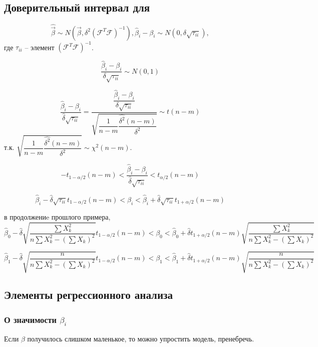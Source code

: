 \subsection{Доверительный интервал для \beta}

\[
  \hat{\vec{\beta}} \sim N\left(\vec{\beta}, \delta^2 (\mathcal{F}^T \mathcal{F})^{-1}\right),
  \hat{\beta}_i - \beta_i \sim N(0, \delta \sqrt{\tau_{ii}}),
\]
где $\tau_{ii}$ -- элемент $(\mathcal{F}^T \mathcal{F})^{-1}$.

\[
  \dfrac{\hat{\beta}_i - \beta_i}{\delta \sqrt{\tau_{ii}}} \sim N(0, 1)
\]

\[ 
  \dfrac{\hat{\beta}_i - \beta_i}{\hat{\delta} \sqrt{\tau_{ii}}}
  = \dfrac
  { \dfrac{\hat{\beta}_i - \beta_i}{\delta \sqrt{\tau_{ii}}} }
  { \sqrt{ \dfrac{1}{n-m} \dfrac{\hat{\delta^2} (n-m)}{\delta^2} } }
  \sim t(n-m)
\]
т.к. $ \sqrt{ \dfrac{1}{n-m} \dfrac{\hat{\delta^2} (n-m)}{\delta^2} } \sim \chi^2(n-m) $.

\[
  -t_{1-\alpha/2} (n-m) <
  \dfrac{\hat{\beta}_i - \beta_i}{\hat{\delta} \sqrt{\tau_{ii}}}
  < t_{\alpha/2} (n-m)
\]

\[
  \hat{\beta}_i - \hat{\delta} \sqrt{\tau_{ii}} t_{1-\alpha/2} (n-m) < 
  \beta_i <
  \hat{\beta}_i + \hat{\delta} \sqrt{\tau_{ii}} t_{1 + \alpha/2} (n-m)
\]

\begin{ex}
  в продолжениe прошлого примера,
  \[
    \hat{\beta}_0 - \hat{\delta} \sqrt{ \dfrac{\sum X_k^2}{n \sum{X_k^2} - \left( \sum X_k \right)^2 } } t_{1-\alpha/2} (n-m) < 
    \beta_0 <
    \hat{\beta}_0 + \hat{\delta} t_{1 + \alpha/2} (n-m) \sqrt{ \dfrac{\sum X_k^2}{n \sum{X_k^2} - \left( \sum X_k \right)^2 } }
  \]
  
  \[
    \hat{\beta}_1 - \hat{\delta} \sqrt{ \dfrac{n}{n \sum{X_k^2} - \left( \sum X_k \right)^2 } } t_{1-\alpha/2} (n-m) < 
    \beta_1 <
    \hat{\beta}_1 + \hat{\delta} t_{1 + \alpha/2} (n-m) \sqrt{ \dfrac{n}{n \sum{X_k^2} - \left( \sum X_k \right)^2 } }
  \]
\end{ex}

\subsection{Элементы регрессионного анализа}

\subsubsection{О значимости $\beta_i$}
Если $\beta$ получилось слишком маленькое, то можно упростить модель, пренебречь.

